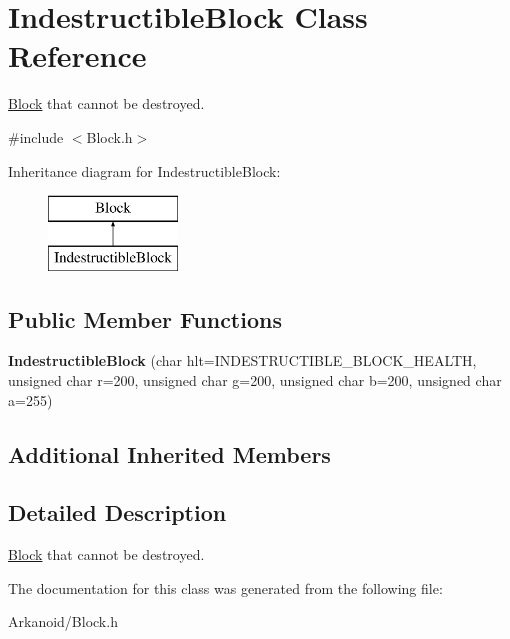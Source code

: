 \hypertarget{class_indestructible_block}{}\section{Indestructible\+Block Class Reference}
\label{class_indestructible_block}


\hyperlink{class_block}{Block} that cannot be destroyed.  




{\ttfamily \#include $<$Block.\+h$>$}

Inheritance diagram for Indestructible\+Block\+:\begin{figure}[H]
\begin{center}
\leavevmode
\includegraphics[height=2.000000cm]{class_indestructible_block}
\end{center}
\end{figure}
\subsection*{Public Member Functions}
\begin{DoxyCompactItemize}
\item 
\mbox{\label{class_indestructible_block_afc762bad01f64e0b8826aab7691c5df4}} 
{\bfseries Indestructible\+Block} (char hlt=I\+N\+D\+E\+S\+T\+R\+U\+C\+T\+I\+B\+L\+E\+\_\+\+B\+L\+O\+C\+K\+\_\+\+H\+E\+A\+L\+TH, unsigned char r=200, unsigned char g=200, unsigned char b=200, unsigned char a=255)
\end{DoxyCompactItemize}
\subsection*{Additional Inherited Members}


\subsection{Detailed Description}
\hyperlink{class_block}{Block} that cannot be destroyed. 

The documentation for this class was generated from the following file\+:\begin{DoxyCompactItemize}
\item 
Arkanoid/Block.\+h\end{DoxyCompactItemize}
